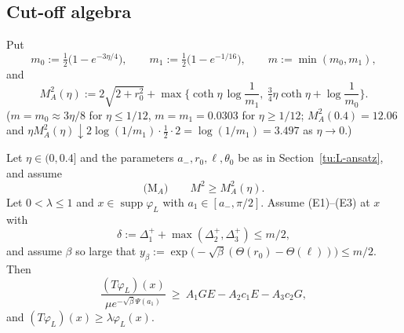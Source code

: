 \subsection{Cut-off algebra}

Put
\[
m_0:=\tfrac12\big(1-e^{-3\eta/4}\big),\qquad m_1:=\tfrac12\big(1-e^{-1/16}\big),\qquad m:=\min(m_0,m_1),
\]
and
\[
M_A^2(\eta):=2\sqrt{2+r_0^2}+\max\Big\{\coth\eta\,\log\frac1{m_1},\ \tfrac34\eta\coth\eta+\log\frac1{m_0}\Big\}.
\]
($m=m_0\approx3\eta/8$ for $\eta\le1/12$, $m=m_1=0.0303$ for $\eta\ge1/12$; $M_A^2(0.4)=12.06$ and
$\eta M_A^2(\eta)\downarrow2\log(1/m_1)\cdot\frac12\cdot2=\log(1/m_1)=3.497$ as $\eta\to0$.)

\begin{lemma}[S4-alg]\label{tu:L-S4}
Let $\eta\in(0,0.4]$ and the parameters $a_-,r_0,\ell,\theta_0$ be as in Section~\ref{tu:L-ansatz}, and assume
\[
\text{(M$_A$)}\qquad M^2\ge M_A^2(\eta).
\]
Let $0<\lambda\le1$ and $x\in\operatorname{supp}\varphi_L$ with $a_1\in[a_-,\pi/2]$. Assume (E1)--(E3) at $x$ with
\[
\delta:=\Delta_1^++\max(\Delta_2^+,\Delta_3^+)\le m/2,
\]
and assume $\beta$ so large that $y_\beta:=\exp\big(-\sqrt\beta(\Theta(r_0)-\Theta(\ell))\big)\le m/2$. Then
\begin{equation}\label{tu:L-cutoff}
\frac{(T\varphi_L)(x)}{\mu e^{-\sqrt\beta\Psi(a_1)}}\ \ge\ A_1GE-A_2c_1E-A_3c_2G,
\end{equation}
and $(T\varphi_L)(x)\ge\lambda\varphi_L(x)$.
\end{lemma}

